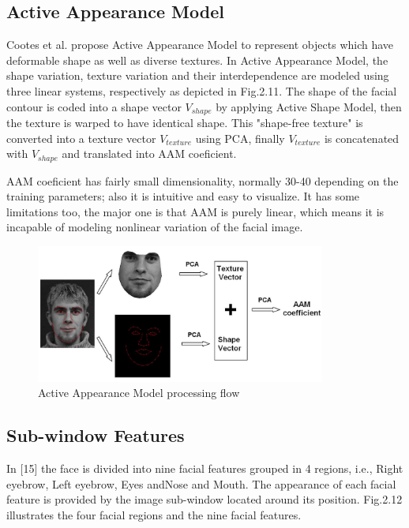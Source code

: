 \documentclass[12pt, twoside]{report}
\begin{document}
	\subsection{Active Appearance Model}
	\par
	Cootes et al. propose Active Appearance Model \cite{17} to represent objects which have deformable shape as well as diverse textures. In Active Appearance Model, the shape variation, texture variation and their interdependence are modeled using three linear systems, respectively as depicted in Fig.2.11. The shape of the facial contour is coded into a shape vector $V_{shape}$ by applying Active Shape Model, then the texture is warped to have identical
shape. This "shape-free texture" is converted into a texture vector $V_{texture}$ using PCA, finally $V_{texture}$ is concatenated with $V_{shape}$ and translated into AAM coeficient.\par
AAM coeficient has fairly small dimensionality, normally 30-40 depending on the training parameters; also it is intuitive and easy to visualize. It has some limitations too, the
major one is that AAM is purely linear, which means it is incapable of modeling nonlinear	variation of the facial image.\\
		\begin{figure}
			\begin{center}
				\includegraphics[width=0.85\textwidth]{img/92_2.png}	
			\end{center}
			\caption{Active Appearance Model processing flow}
			\label{fig 2.11}	
		\end{figure}
		\newpage
	\subsection{Sub-window Features}
	In [15] the face is divided into nine facial features grouped in 4 regions, i.e., Right eyebrow, Left eyebrow, Eyes andNose and Mouth. The appearance of each facial feature is provided by the image sub-window located around its position. Fig.2.12 illustrates the four facial regions and the nine facial features.
\end{document}
